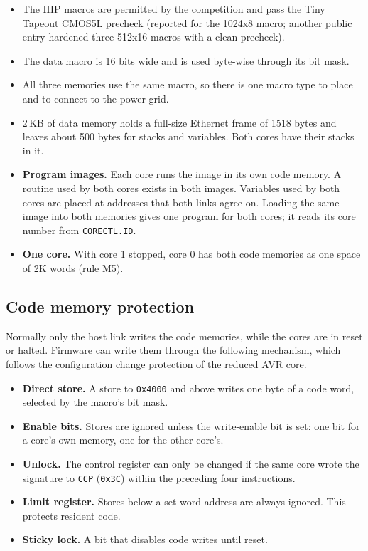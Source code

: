 \documentclass[10pt,a4paper]{article}
\newcommand{\reg}[1]{\texttt{#1}}
\begin{document}
\begin{itemize}
\item The IHP macros are permitted by the competition and pass the Tiny Tapeout CMOS5L precheck (reported for the
1024x8 macro; another public entry hardened three 512x16 macros with a clean precheck).
\item The data macro is 16 bits wide and is used byte-wise through its bit mask.
\item All three memories use the same macro, so there is one macro type to place and to connect to the power
grid.
\item 2\,KB of data memory holds a full-size Ethernet frame of 1518 bytes and leaves about 500 bytes for stacks
and variables. Both cores have their stacks in it.
\item \textbf{Program images.} Each core runs the image in its own code memory. A routine used by both cores exists
in both images. Variables used by both cores are placed at addresses that both links agree on. Loading the
same image into both memories gives one program for both cores; it reads its core number from
\reg{CORECTL.ID}.
\item \textbf{One core.} With core 1 stopped, core 0 has both code memories as one space of 2K words
(rule M5).
\end{itemize}

\subsection{Code memory protection}

Normally only the host link writes the code memories, while the cores are in reset or halted. Firmware can
write them through the following mechanism, which follows the configuration change protection of the reduced
AVR core.

\begin{itemize}
\item \textbf{Direct store.} A store to \texttt{0x4000} and above writes one byte of a code word, selected by the
macro's bit mask.
\item \textbf{Enable bits.} Stores are ignored unless the write-enable bit is set: one bit for a core's own
memory, one for the other core's.
\item \textbf{Unlock.} The control register can only be changed if the same core wrote the signature to
\reg{CCP} (\texttt{0x3C}) within the preceding four instructions.
\item \textbf{Limit register.} Stores below a set word address are always ignored. This protects resident code.
\item \textbf{Sticky lock.} A bit that disables code writes until reset.
\end{itemize}
\end{document}

